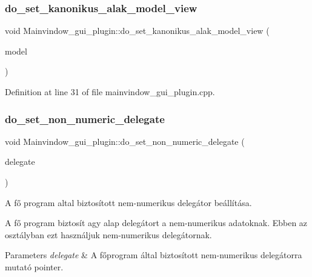 \subsubsection{\texorpdfstring{do\+\_\+set\+\_\+kanonikus\+\_\+alak\+\_\+model\+\_\+view}{do\_set\_kanonikus\_alak\_model\_view}}
{\footnotesize\ttfamily void Mainvindow\+\_\+gui\+\_\+plugin\+::do\+\_\+set\+\_\+kanonikus\+\_\+alak\+\_\+model\+\_\+view (\begin{DoxyParamCaption}\item[{Q\+Standard\+Item\+Model $\ast$}]{model }\end{DoxyParamCaption})\hspace{0.3cm}{\ttfamily [slot]}}



Definition at line 31 of file mainvindow\+\_\+gui\+\_\+plugin.\+cpp.

\mbox{\label{classMainvindow__gui__plugin_a7f8f250d9d8b2adc3ee04b768f9b3ee8}} 
\subsubsection{\texorpdfstring{do\+\_\+set\+\_\+non\+\_\+numeric\+\_\+delegate}{do\_set\_non\_numeric\_delegate}}
{\footnotesize\ttfamily void Mainvindow\+\_\+gui\+\_\+plugin\+::do\+\_\+set\+\_\+non\+\_\+numeric\+\_\+delegate (\begin{DoxyParamCaption}\item[{Q\+Item\+Delegate $\ast$}]{delegate }\end{DoxyParamCaption})\hspace{0.3cm}{\ttfamily [slot]}}



A fő program altal biztosított nem-\/numerikus delegátor beállítása. 

A fő program biztosít agy alap delegátort a nem-\/numerikus adatoknak. Ebben az osztályban ezt használjuk nem-\/numerikus delegátornak.


\begin{DoxyParams}{Parameters}
{\em delegate} & A főprogram által biztosított nem-\/numerikus delegátorra mutató pointer. \\
\hline
\end{DoxyParams}


